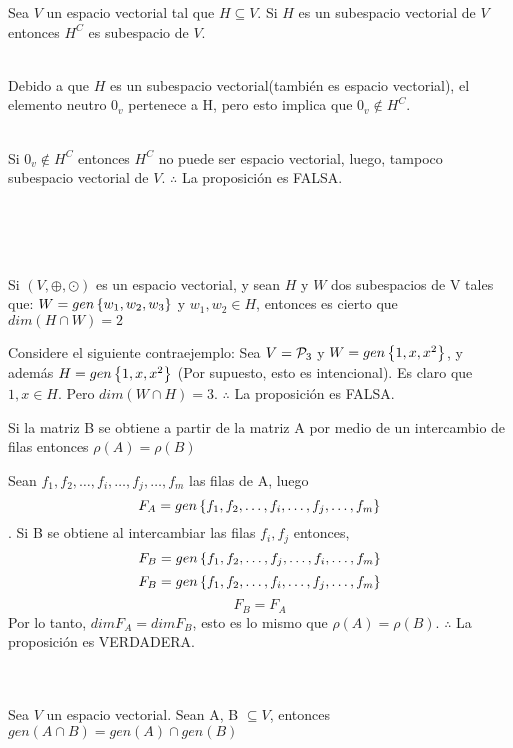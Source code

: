 \begin{enumerate}
\begin{prop}
Sea $V$ un espacio vectorial tal que $H\subseteq V$. Si $H$ es un subespacio vectorial de $V$ entonces $H^C$ es subespacio de $V$.

\end{prop}

\sol
~\\
Debido a que $H$ es un subespacio vectorial(tambi\'en es espacio vectorial), el elemento neutro $0_v$ pertenece a H, pero esto implica que $0_v \notin H^C$.

~\\
Si $0_v \notin H^C$ entonces $H^C$ no puede ser espacio vectorial, luego, tampoco subespacio vectorial de $ V$. 
$\therefore$ La proposici\'on es FALSA.

~\\
~\\
~\\
\begin{prop}
Si $(V, \oplus, \odot)$ es un espacio vectorial, y sean $H$ y $W$ dos subespacios de V tales que:
$W=gen \left\{w_1, w_2, w_3 \right\} $ y $w_1, w_2  \in H$, entonces es cierto que $dim(H\cap W)=2$
\end{prop}

\sol
Considere el siguiente contraejemplo:
Sea $V={\cal P}_3$ y $W=gen \left\{1, x, x^2 \right\} $, y adem\'as $H=gen \left\{1, x, x^2 \right\} $ (Por supuesto, esto es intencional). Es claro que $1, x \in H$. Pero $dim(W\cap H)=3$.
$\therefore$ La proposici\'on es FALSA.

\newpage
\begin{prop}
Si la matriz B se obtiene a partir de la matriz A por medio de un intercambio de filas entonces $\rho(A)=\rho(B)$
\end{prop}

\sol
Sean $f_1, f_2, \ldots, f_i, \ldots , f_j, \ldots, f_m$ las filas de A, luego $$F_A=gen \left\{f_1, f_2, \ldots, f_i, \ldots , f_j, \ldots, f_m \right\} $$. Si B se obtiene al intercambiar las filas $f_i, f_j$ entonces, 
$$F_B=gen \left\{f_1, f_2, \ldots, f_j, \ldots , f_i, \ldots, f_m \right\} $$
$$F_B=gen \left\{f_1, f_2, \ldots, f_i, \ldots , f_j, \ldots, f_m \right\} $$
$$F_B=F_A$$
Por lo tanto, $dimF_A=dim F_B$, esto es lo mismo que $\rho(A)=\rho(B)$.
$\therefore $ La proposici\'on es VERDADERA.
~\\
~\\
~\\

\begin{prop}
Sea $V$ un espacio vectorial. Sean A, B $\subseteq V$, entonces $gen(A\cap B)=gen(A)\cap gen(B)$
\end{prop}
\sol


\end{enumerate}
